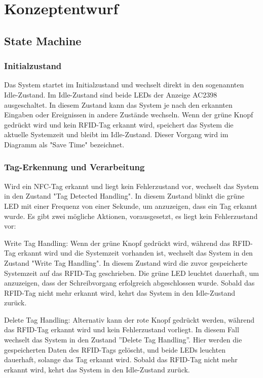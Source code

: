\chapter*{Konzeptentwurf}
\label{cha:Konzeptentwurf}

\section*{State Machine}
\label{sec:State Machine}

\subsection*{Initialzustand}
\label{subsec:Initialzustand}

Das System startet im Initialzustand und wechselt direkt in den sogenannten Idle-Zustand. Im Idle-Zustand sind beide LEDs der Anzeige AC2398 ausgeschaltet. In diesem Zustand kann das System je nach den erkannten Eingaben oder Ereignissen in andere Zustände wechseln. Wenn der grüne Knopf gedrückt wird und kein RFID-Tag erkannt wird, speichert das System die aktuelle Systemzeit und bleibt im Idle-Zustand. Dieser Vorgang wird im Diagramm als "Save Time" bezeichnet.

\subsection*{Tag-Erkennung und Verarbeitung}
\label{subsec:Tag-ErkennungundVerarbeitung}

Wird ein NFC-Tag erkannt und liegt kein Fehlerzustand vor, wechselt das System in den Zustand "Tag Detected Handling". In diesem Zustand blinkt die grüne LED mit einer Frequenz von einer Sekunde, um anzuzeigen, dass ein Tag erkannt wurde. Es gibt zwei mögliche Aktionen, vorausgesetzt, es liegt kein Fehlerzustand vor:

Write Tag Handling: Wenn der grüne Knopf gedrückt wird, während das RFID-Tag erkannt wird und die Systemzeit vorhanden ist, wechselt das System in den Zustand "Write Tag Handling". In diesem Zustand wird die zuvor gespeicherte Systemzeit auf das RFID-Tag geschrieben. Die grüne LED leuchtet dauerhaft, um anzuzeigen, dass der Schreibvorgang erfolgreich abgeschlossen wurde. Sobald das RFID-Tag nicht mehr erkannt wird, kehrt das System in den Idle-Zustand zurück.

Delete Tag Handling: Alternativ kann der rote Knopf gedrückt werden, während das RFID-Tag erkannt wird und kein Fehlerzustand vorliegt. In diesem Fall wechselt das System in den Zustand ''Delete Tag Handling''. Hier werden die gespeicherten Daten des RFID-Tags gelöscht, und beide LEDs leuchten dauerhaft, solange das Tag erkannt wird. Sobald das RFID-Tag nicht mehr erkannt wird, kehrt das System in den Idle-Zustand zurück.

